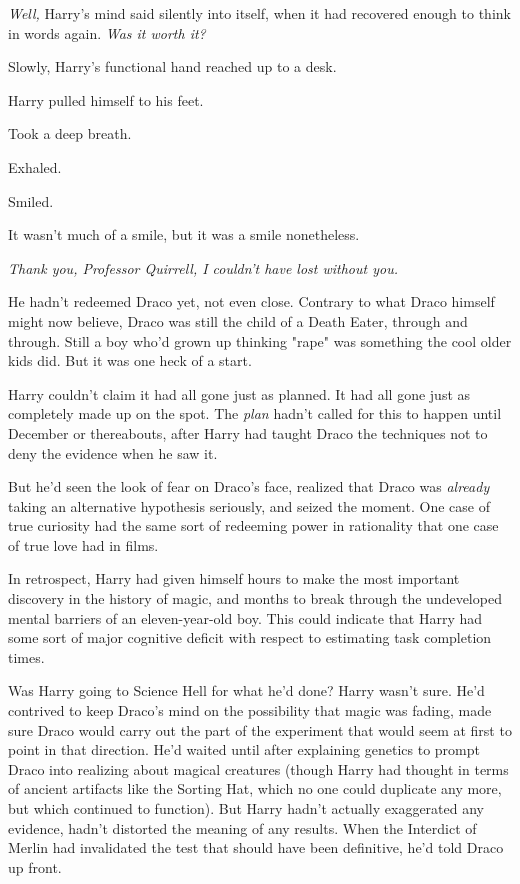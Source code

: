 \emph{Well,} Harry's mind said silently into itself, when it had recovered
enough to think in words again. \emph{Was it worth it?}

Slowly, Harry's functional hand reached up to a desk.

Harry pulled himself to his feet.

Took a deep breath.

Exhaled.

Smiled.

It wasn't much of a smile, but it was a smile nonetheless.

\emph{Thank you, Professor Quirrell, I couldn't have lost without you.}

He hadn't redeemed Draco yet, not even close. Contrary to what Draco himself
might now believe, Draco was still the child of a Death Eater, through and
through. Still a boy who'd grown up thinking "rape" was something the cool
older kids did. But it was one heck of a start.

Harry couldn't claim it had all gone just as planned. It had all gone just as
completely made up on the spot. The \emph{plan} hadn't called for this to
happen until December or thereabouts, after Harry had taught Draco the
techniques not to deny the evidence when he saw it.

But he'd seen the look of fear on Draco's face, realized that Draco was
\emph{already} taking an alternative hypothesis seriously, and seized the
moment. One case of true curiosity had the same sort of redeeming power in
rationality that one case of true love had in films.

In retrospect, Harry had given himself hours to make the most important
discovery in the history of magic, and months to break through the undeveloped
mental barriers of an eleven-year-old boy. This could indicate that Harry had
some sort of major cognitive deficit with respect to estimating task completion
times.

Was Harry going to Science Hell for what he'd done? Harry wasn't sure. He'd
contrived to keep Draco's mind on the possibility that magic was fading, made
sure Draco would carry out the part of the experiment that would seem at first
to point in that direction. He'd waited until after explaining genetics to
prompt Draco into realizing about magical creatures (though Harry had thought
in terms of ancient artifacts like the Sorting Hat, which no one could
duplicate any more, but which continued to function). But Harry hadn't actually
exaggerated any evidence, hadn't distorted the meaning of any results. When the
Interdict of Merlin had invalidated the test that should have been definitive,
he'd told Draco up front.

